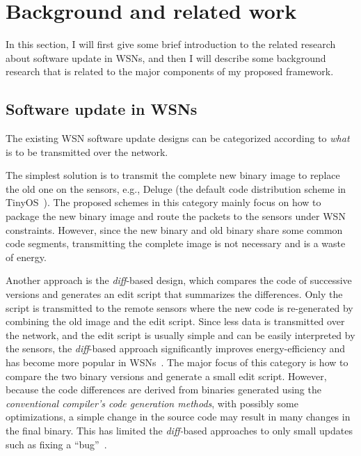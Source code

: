 \chapter{Background and related work}\label{chap:related}

In this section, I will first give some brief introduction to the related research about software update in WSNs, and 
then I will describe some background research that is related to the major components of my proposed framework.


\section{Software update in WSNs}

The existing WSN software update designs can be categorized according to {\em what} is to be transmitted over the 
network. 

The simplest solution is to transmit the complete new binary image to replace the old one on the sensors, e.g., Deluge 
(the default code distribution scheme in TinyOS~\cite{tinyos}).
The proposed schemes in this category mainly focus on how to package the new binary image and route the packets to the 
sensors under WSN constraints.
However, since the new binary and old binary share some common code segments, transmitting the complete image is not 
necessary and is a waste of energy.

Another approach is the {\em diff}-based design, which compares the code of successive versions and generates an edit 
script that summarizes the differences.
Only the script is transmitted to the remote sensors where the new code is re-generated by combining the old image and 
the edit script.  Since
less data is transmitted over the network, and the edit script is usually simple and can be easily interpreted by the 
sensors, the {\em diff}-based approach significantly improves energy-efficiency and has
become more popular in 
WSNs~\cite{related:script,stream,related:jeong-script,related:dynamic1,related:dynamic2,related:flexcup}.
The major focus of this category is how to compare the two binary versions and generate a small edit script.
However, because the code differences are derived from binaries generated using the {\em conventional compiler's code 
generation methods}, with possibly some optimizations, a simple change in the source code may result in many changes in 
the final binary. This has limited the {\em diff-}based approaches to only small updates such as fixing a 
``bug''~\cite{related:script}.


